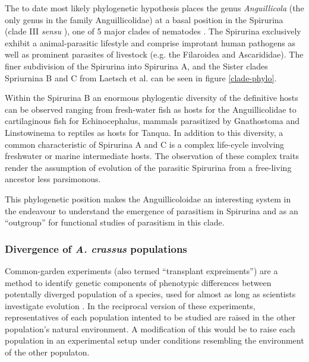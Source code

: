 The to date most likely phylogenetic hypothesis places the genus
\textit{Anguillicola} (the only genus in the family Anguillicolidae)
at a basal position in the Spirurina (clade III \textit{sensu}
\cite{blaxter_molecular_1998}), one of 5 major clades of nematodes
\cite{nadler_molecular_2007, wijov_evolutionary_2006}. The Spirurina
exclusively exhibit a animal-parasitic lifestyle and comprise
improtant human pathogens as well as prominent parasites of livestock
(e.g. the Filaroidea and Ascarididae). The finer subdivision of the
Spirurina into Spirurina A, and the Sister clades Spriurnina B and C
from Laetsch et al. can be seen in figure \ref{clade-phylo}.

Within the Spirurina B an enormous phylogentic diversity of the
definitive hosts can be observed ranging from fresh-water fish as
hosts for the Anguillicolidae to cartilaginous fish for
Echinocephalus, mammals parasitized by Gnathostoma and Linstowinema to
reptiles as hosts for Tanqua. In addition to this diversity, a common
characteristic of Spirurina A and C is a complex life-cycle involving
freshwater or marine intermediate hosts. The observation of these
complex traits render the assumption of evolution of the parasitic
Spirurina from a free-living ancestor less parsimonous.


This phylogenetic position makes the Anguillicoloidae an interesting
system in the endeavour to understand the emergence of parasitism in
Spirurina and as an ``outgroup'' for functional studies of parasitism
in this clade.

\subsubsection{Divergence of \textit{A. crassus} populations}
\label{div-ac}

Common-garden experiments (also termed ``transplant expreiments'') are
a method to identify genetic components of phenotypic differences
between potentally diverged population of a species, used for almost
as long as scientists investigate evolution
\cite{kerner_classic_common_garden, bonnier_classic_common_garden}. In
the reciprocal version of these experiments, representatives of each
population intented to be studied are raised in the other population's
natural environment. A modification of this would be to raise each
population in an experimental setup under conditions resembling the
environment of the other populaton.

